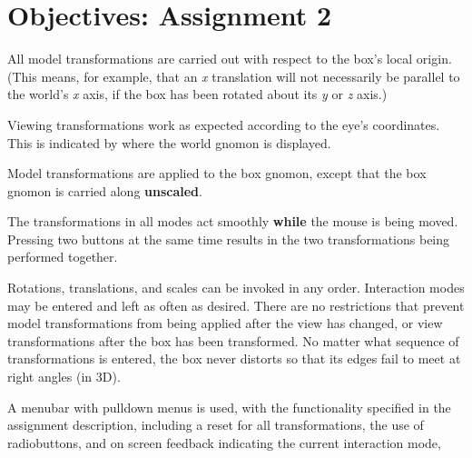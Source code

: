 \newpage
\section{Objectives: \hfill Assignment 2}

 \bigskip

 \bigskip

 \bigskip

 \bigskip

\begin{description}\small
\item[\_\_\_ 1:]
        All model transformations are carried out with respect 
        to the box's local origin.  (This means, for example, 
        that an {\it x} translation will not necessarily be 
        parallel to the world's {\it x} axis, if the box has been 
        rotated about its {\it y} or {\it z} axis.)
\item[\_\_\_ 2:]
        Viewing transformations work as expected according
        to the eye's coordinates.  This is indicated by where
        the world gnomon is displayed.
\item[\_\_\_ 3:]
        Model transformations are applied to the box gnomon, except
        that the box gnomon is carried along {\bf unscaled}.
\item[\_\_\_ 4:]
        The transformations in all modes act smoothly {\bf while} the
        mouse is being moved.
        Pressing two buttons at the same time results in the two 
        transformations being performed together.
\item[\_\_\_ 5:]
        Rotations, translations, and scales can be invoked in any order.
        Interaction modes may be entered and left as often as desired.
        There are no restrictions that prevent model transformations
        from being applied after the view has changed, or view 
        transformations after the box has been transformed.
        No matter what sequence of transformations is entered,
        the box never distorts so that its edges fail to meet at right angles 
        (in 3D).
\item[\_\_\_ 6:]
        A menubar with pulldown menus is used, with the functionality
        specified in the assignment description, including a reset 
        for all transformations, the use of radiobuttons,
        and on screen feedback indicating the current interaction mode,

\end{description}
